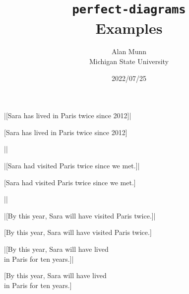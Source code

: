 \documentclass[landscape,12pt]{article}
\title{\texttt{perfect-diagrams}\\Examples}
\author{Alan Munn\\Michigan State University}
\date{2022/07/25}
\begin{document}
\maketitle


|[Sara has lived in Paris twice since 2012]|

[Sara has lived in Paris twice since 2012]

||


|[Sara had visited Paris twice since we met.]|

[Sara had visited Paris twice since we met.]

||



|[By this year, Sara will have visited Paris twice.]|

[By this year, Sara will have visited Paris twice.]

|[By this year, Sara will have lived\\ in Paris for ten years.]|

[By this year, Sara will have lived\\ in Paris for ten years.]
\end{document}
